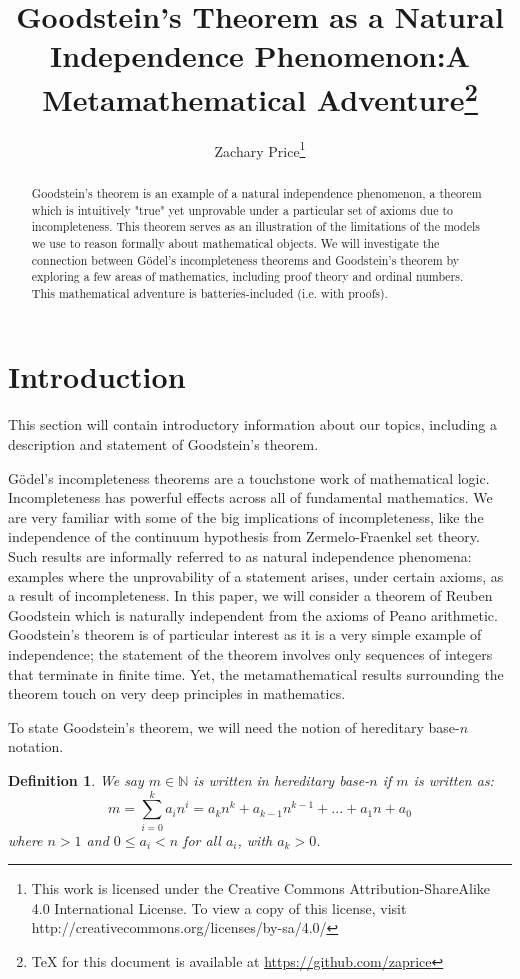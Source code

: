 \documentclass[10pt]{article}
\title{Goodstein's Theorem as a Natural Independence Phenomenon:\newline A Metamathematical Adventure\footnote {
TeX for this document is available at \url{https://github.com/zaprice}
}}
\author{Zachary Price\footnote { 
\ccbysa \indent This work is licensed under the Creative Commons Attribution-ShareAlike 4.0 International License. To view a copy of this license, visit http://creativecommons.org/licenses/by-sa/4.0/
}}
\newcommand{\N}{\mathbb{N}}
\begin{document}
\maketitle

\newtheorem{define}{Definition}
\newtheorem{thm}{Theorem}
\newtheorem{lem}{Lemma}
\newtheorem{conj}{Conjecture}

\begin{abstract}
Goodstein's theorem is an example of a natural independence phenomenon, a theorem which is intuitively "true" yet unprovable under a particular set of axioms due to incompleteness.
This theorem serves as an illustration of the limitations of the models we use to reason formally about mathematical objects.
We will investigate the connection between G{\"o}del's incompleteness theorems and Goodstein's theorem by exploring a few areas of mathematics, including proof theory and ordinal numbers.
This mathematical adventure is batteries-included (i.e. with proofs).
\end{abstract}

\section{Introduction}
This section will contain introductory information about our topics, including a description and statement of Goodstein's theorem.

G{\"o}del's incompleteness theorems are a touchstone work of mathematical logic. Incompleteness has powerful effects across all of fundamental mathematics.
We are very familiar with some of the big implications of incompleteness, like the independence of the continuum hypothesis from Zermelo-Fraenkel set theory.
Such results are informally referred to as natural independence phenomena: examples where the unprovability of a statement arises, under certain axioms, as a result of incompleteness.
In this paper, we will consider a theorem of Reuben Goodstein which is naturally independent from the axioms of Peano arithmetic.
Goodstein's theorem is of particular interest as it is a very simple example of independence; the statement of the theorem involves only sequences of integers that terminate in finite time.
Yet, the metamathematical results surrounding the theorem touch on very deep principles in mathematics.

To state Goodstein's theorem, we will need the notion of hereditary base-$n$ notation.

\begin{define}
We say $m\in\N$ is written in \emph{hereditary base-$n$} if $m$ is written as:
$$m = \sum_{i=0}^{k} a_in^i = a_kn^k + a_{k-1}n^{k-1} + ... + a_1n + a_0$$
where $n>1$ and $0\leq a_i < n$	for all $a_i$, with $a_k>0$.
\end{define}
\end{document}

